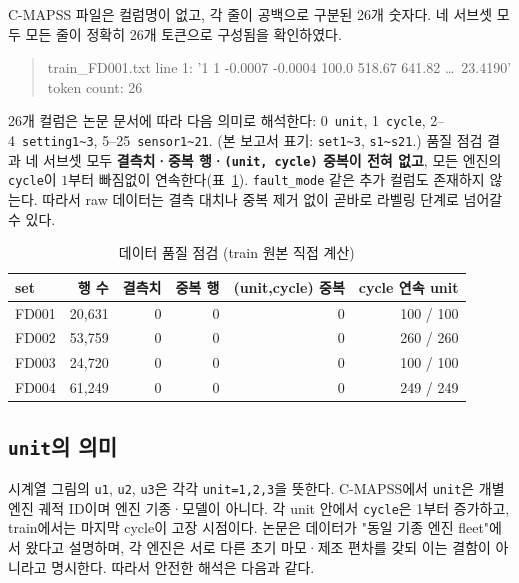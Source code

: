 \documentclass[11pt]{article}
\begin{document}
C-MAPSS 파일은 컬럼명이 없고, 각 줄이 공백으로 구분된 26개 숫자다.
네 서브셋 모두 모든 줄이 정확히 26개 토큰으로 구성됨을 확인하였다.

\begin{quote}\small\ttfamily
train\_FD001.txt line 1: '1 1 -0.0007 -0.0004 100.0 518.67 641.82 \ldots\ 23.4190'\\
token count: 26
\end{quote}

26개 컬럼은 논문 문서에 따라 다음 의미로 해석한다: 0~\texttt{unit}, 1~\texttt{cycle}, 2--4~\texttt{setting1\textasciitilde3}, 5--25~\texttt{sensor1\textasciitilde21}.
(본 보고서 표기: \texttt{set1\textasciitilde3}, \texttt{s1\textasciitilde s21}.)
품질 점검 결과 네 서브셋 모두 \textbf{결측치·중복 행·\texttt{(unit, cycle)} 중복이 전혀 없고}, 모든 엔진의 \texttt{cycle}이 $1$부터 빠짐없이 연속한다(표~\ref{tab:quality}).
\texttt{fault\_mode} 같은 추가 컬럼도 존재하지 않는다.
따라서 raw 데이터는 결측 대치나 중복 제거 없이 곧바로 라벨링 단계로 넘어갈 수 있다.

\begin{table}[H]
\centering
\caption{데이터 품질 점검 (train 원본 직접 계산)}
\label{tab:quality}
\begin{tabular}{lrrrrr}
\toprule
set & 행 수 & 결측치 & 중복 행 & (unit,cycle) 중복 & cycle 연속 unit \\
\midrule
FD001 & 20{,}631 & 0 & 0 & 0 & 100 / 100 \\
FD002 & 53{,}759 & 0 & 0 & 0 & 260 / 260 \\
FD003 & 24{,}720 & 0 & 0 & 0 & 100 / 100 \\
FD004 & 61{,}249 & 0 & 0 & 0 & 249 / 249 \\
\bottomrule
\end{tabular}
\end{table}

\subsection{\texttt{unit}의 의미}

시계열 그림의 \texttt{u1}, \texttt{u2}, \texttt{u3}은 각각 \texttt{unit=1,2,3}을 뜻한다.
C-MAPSS에서 \texttt{unit}은 개별 엔진 궤적 ID이며 엔진 기종·모델이 아니다.
각 unit 안에서 \texttt{cycle}은 1부터 증가하고, train에서는 마지막 cycle이 고장 시점이다.
논문은 데이터가 "동일 기종 엔진 fleet"에서 왔다고 설명하며, 각 엔진은 서로 다른 초기 마모·제조 편차를 갖되 이는 결함이 아니라고 명시한다.
따라서 안전한 해석은 다음과 같다.
\end{document}
